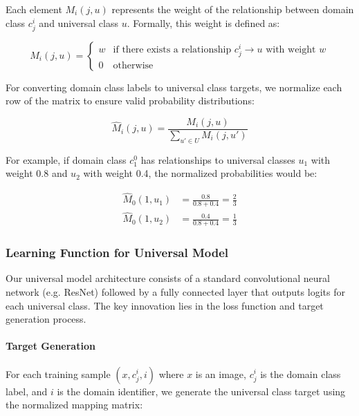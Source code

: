 Each element $M_i(j, u)$ represents the weight of the relationship between domain class $c_j^i$ and universal class $u$.
Formally, this weight is defined as:

\begin{equation}
      M_i(j, u) =
      \begin{cases}
            w & \text{if there exists a relationship } c_j^i \rightarrow u \text{ with weight } w \\
            0 & \text{otherwise}
      \end{cases}
\end{equation}

For converting domain class labels to universal class targets, we normalize each row of the matrix
to ensure valid probability distributions:

\begin{equation}
      \hat{M}_i(j, u) = \frac{M_i(j, u)}{\sum_{u' \in U} M_i(j, u')}
\end{equation}

For example, if domain class $c_1^0$ has relationships to universal classes $u_1$ with weight 0.8
and $u_2$ with weight 0.4, the normalized probabilities would be:

\begin{align*}
      \hat{M}_0(1, u_1) & = \frac{0.8}{0.8 + 0.4} = \frac{2}{3} \\
      \hat{M}_0(1, u_2) & = \frac{0.4}{0.8 + 0.4} = \frac{1}{3}
\end{align*}

\subsubsection{Learning Function for Universal Model}

Our universal model architecture consists of a standard convolutional neural network
(e.g. ResNet) followed by a fully connected layer that outputs logits for each universal class.
The key innovation lies in the loss function and target generation process.

\paragraph{Target Generation}

For each training sample $(x, c_j^i, i)$ where $x$ is an image, $c_j^i$ is the domain class label,
and $i$ is the domain identifier, we generate the universal class target using the normalized mapping matrix:

